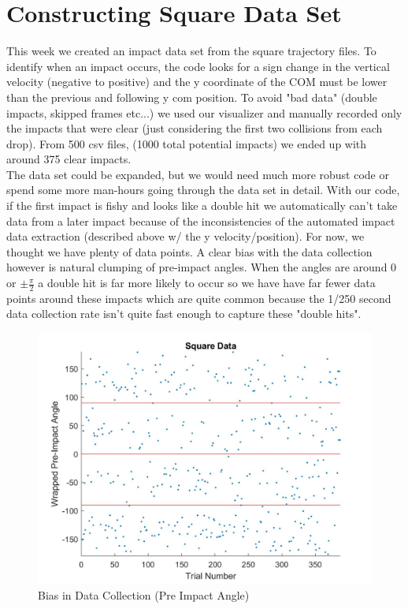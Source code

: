\documentclass{article}
\begin{document}
\section{Constructing Square Data Set}
This week we created an impact data set from the square trajectory files. To identify when an impact occurs, the code looks for a sign change in the vertical velocity (negative to positive) and the y coordinate of the COM must be lower than the previous and following y com position. To avoid "bad data" (double impacts, skipped frames etc...) we used our visualizer and manually recorded only the impacts that were clear (just considering the first two collisions from each drop). From 500 csv files, (1000 total potential impacts) we ended up with around 375 clear impacts. \\

\noindent The data set could be expanded, but we would need much more robust code or spend some more man-hours going through the data set in detail. With our code, if the first impact is fishy and looks like a double hit we automatically can't take data from a later impact because of the inconsistencies of the automated impact data extraction (described above w/ the y velocity/position). For now, we thought we have plenty of data points. A clear bias with the data collection however is natural clumping of pre-impact angles. When the angles are around $0$ or $\pm \frac{\pi}{2}$ a double hit is far more likely to occur so we have have far fewer data points around these impacts which are quite common because the 1/250 second data collection rate isn't quite fast enough to capture these "double hits". 

 \begin{figure}[h!]
        \centering
        \includegraphics[scale=0.11]{SquareDataBias.jpg}
        \caption{Bias in Data Collection (Pre Impact Angle)}
        \label{fig:dataBias}
\end{figure}
\end{document}
